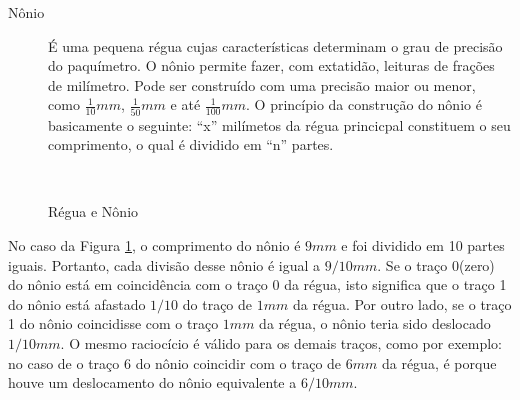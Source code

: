 \begin{description}
\item[{\textsc Nônio}] É uma pequena régua cujas características determinam o grau de precisão do paquímetro. O nônio permite fazer, com extatidão, leituras de frações de milímetro. Pode ser construído com uma precisão maior ou menor, como  $\frac{1}{10}mm$, $\frac{1}{50}mm$ e até  $\frac{1}{100}mm$. O princípio da construção do nônio é basicamente o seguinte: ``x'' milímetos da régua princicpal constituem o seu comprimento, o qual é dividido em ``n'' partes.
\end{description}

\begin{figure}[h]
\label{fig:reg-non}
\centering
\def\esqnonio{-0.1cm}
\def\largnonio{6*0.19cm}
\\

\caption{Régua e Nônio}
\end{figure}

No caso da Figura \ref{fig:reg-non}, o comprimento do nônio é $9mm$ e foi dividido em 10 partes iguais. Portanto, cada divisão desse nônio é igual a $9/10mm$. Se o traço 0(zero) do nônio está em coincidência com o traço 0 da régua, isto significa que o traço 1 do nônio está afastado $1/10$ do traço de $1mm$ da régua. Por outro lado, se o traço 1 do nônio coincidisse com o traço $1mm$ da régua, o nônio teria sido deslocado $1/10mm$. O mesmo raciocício é válido para os demais traços, como por exemplo: no caso de o traço 6 do nônio coincidir com o traço de $6mm$ da régua, é porque houve um deslocamento do nônio equivalente a $6/10mm$.

